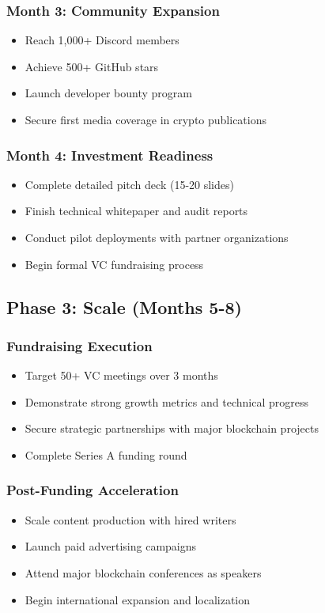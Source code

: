 \documentclass[12pt,a4paper]{article}
\begin{document}
\subsubsection{Month 3: Community Expansion}
\begin{itemize}
    \item Reach 1,000+ Discord members
    \item Achieve 500+ GitHub stars
    \item Launch developer bounty program
    \item Secure first media coverage in crypto publications
\end{itemize}

\subsubsection{Month 4: Investment Readiness}
\begin{itemize}
    \item Complete detailed pitch deck (15-20 slides)
    \item Finish technical whitepaper and audit reports
    \item Conduct pilot deployments with partner organizations
    \item Begin formal VC fundraising process
\end{itemize}

\subsection{Phase 3: Scale (Months 5-8)}

\subsubsection{Fundraising Execution}
\begin{itemize}
    \item Target 50+ VC meetings over 3 months
    \item Demonstrate strong growth metrics and technical progress  
    \item Secure strategic partnerships with major blockchain projects
    \item Complete Series A funding round
\end{itemize}

\subsubsection{Post-Funding Acceleration}  
\begin{itemize}
    \item Scale content production with hired writers
    \item Launch paid advertising campaigns
    \item Attend major blockchain conferences as speakers
    \item Begin international expansion and localization
\end{itemize}
\end{document}
